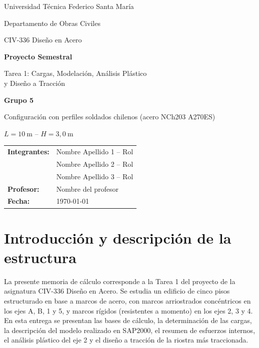 \documentclass[11pt,letterpaper]{article}
\begin{document}
\begin{titlepage}
\centering
{\large Universidad Técnica Federico Santa María\par}
{\large Departamento de Obras Civiles\par}
\vspace{3cm}
{\Large CIV-336 Diseño en Acero\par}
\vspace{1cm}
{\huge\bfseries Proyecto Semestral\par}
\vspace{0.4cm}
{\LARGE Tarea 1: Cargas, Modelación, Análisis Plástico\\ y Diseño a Tracción\par}
\vspace{2cm}
{\Large\bfseries Grupo 5\par}
\vspace{0.3cm}
{\large Configuración con perfiles soldados chilenos (acero NCh203 A270ES)\par}

\vspace{0.3cm}
{\large $L = 10\ \mathrm{m}$ \quad -- \quad $H = 3{,}0\ \mathrm{m}$\par}
\vfill
\begin{flushleft}
\begin{tabular}{ll}
\textbf{Integrantes:} & Nombre Apellido 1 -- Rol \\
                      & Nombre Apellido 2 -- Rol \\
                      & Nombre Apellido 3 -- Rol \\[0.3cm]
\textbf{Profesor:}    & Nombre del profesor \\
\textbf{Fecha:}       & \today
\end{tabular}
\end{flushleft}
\end{titlepage}

\tableofcontents
\newpage

\section{Introducción y descripción de la estructura}

La presente memoria de cálculo corresponde a la Tarea 1 del proyecto de la asignatura
CIV-336 Diseño en Acero. Se estudia un edificio de cinco pisos estructurado en base a marcos de acero,
con marcos arriostrados concéntricos en los ejes A, B, 1 y 5, y marcos rígidos (resistentes a momento)
en los ejes 2, 3 y 4. En esta entrega se presentan las bases de cálculo, la determinación de las cargas,
la descripción del modelo realizado en SAP2000, el resumen de esfuerzos internos, el análisis plástico del
eje 2 y el diseño a tracción de la riostra más traccionada.
\end{document}

